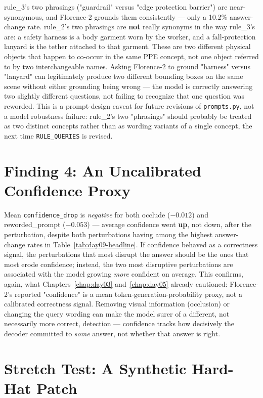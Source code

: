 rule\_3's two phrasings ("guardrail" versus "edge protection barrier") are near-synonymous, and
Florence-2 grounds them consistently --- only a 10.2\% answer-change rate. rule\_2's two phrasings
are \textbf{not} really synonyms in the way rule\_3's are: a safety harness is a body garment worn
by the worker, and a fall-protection lanyard is the tether attached to that garment. These are two
different physical objects that happen to co-occur in the same PPE concept, not one object referred
to by two interchangeable names. Asking Florence-2 to ground "harness" versus "lanyard" can
legitimately produce two different bounding boxes on the same scene without either grounding being
wrong --- the model is correctly answering two slightly different questions, not failing to
recognize that one question was reworded. This is a prompt-design caveat for future revisions of
\texttt{prompts.py}, not a model robustness failure: rule\_2's two "phrasings" should probably be
treated as two distinct concepts rather than as wording variants of a single concept, the next time
\texttt{RULE\_QUERIES} is revised.

\section{Finding 4: An Uncalibrated Confidence Proxy}

Mean \texttt{confidence\_drop} is \emph{negative} for both occlude ($-0.012$) and reworded\_prompt
($-0.053$) --- average confidence went \textbf{up}, not down, after the perturbation, despite both
perturbations having among the highest answer-change rates in Table~\ref{tab:day09-headline}. If
confidence behaved as a correctness signal, the perturbations that most disrupt the answer should be
the ones that most erode confidence; instead, the two most disruptive perturbations are associated
with the model growing \emph{more} confident on average. This confirms, again, what
Chapters~\ref{chap:day03} and~\ref{chap:day05} already cautioned: Florence-2's reported "confidence"
is a mean token-generation-probability proxy, not a calibrated correctness signal. Removing visual
information (occlusion) or changing the query wording can make the model surer of a different, not
necessarily more correct, detection --- confidence tracks how decisively the decoder committed to
\emph{some} answer, not whether that answer is right.

\section{Stretch Test: A Synthetic Hard-Hat Patch}
\label{sec:day09-stretch}


